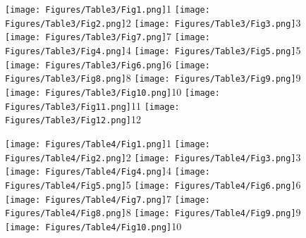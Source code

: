 \documentclass[a4paper, 11pt, oneside]{article}
\begin{document}
\clearpage
{}
\cfoot{\thepage}
\begin{figure}[p]
\texttt{[image: Figures/Table3/Fig1.png]}\tiny 1
\texttt{[image: Figures/Table3/Fig2.png]}\tiny 2
\texttt{[image: Figures/Table3/Fig3.png]}\tiny 3
\texttt{[image: Figures/Table3/Fig7.png]}\tiny 7
\texttt{[image: Figures/Table3/Fig4.png]}\tiny 4
\texttt{[image: Figures/Table3/Fig5.png]}\tiny 5
\texttt{[image: Figures/Table3/Fig6.png]}\tiny 6
\texttt{[image: Figures/Table3/Fig8.png]}\tiny 8
\texttt{[image: Figures/Table3/Fig9.png]}\tiny 9
\texttt{[image: Figures/Table3/Fig10.png]}\tiny 10
\texttt{[image: Figures/Table3/Fig11.png]}\tiny 11
\texttt{[image: Figures/Table3/Fig12.png]}\tiny 12
\end{figure}
\clearpage
{}
\cfoot{\thepage}
\begin{figure}[p]
\texttt{[image: Figures/Table4/Fig1.png]}\tiny 1
\texttt{[image: Figures/Table4/Fig2.png]}\tiny 2
\texttt{[image: Figures/Table4/Fig3.png]}\tiny 3
\texttt{[image: Figures/Table4/Fig4.png]}\tiny 4
\texttt{[image: Figures/Table4/Fig5.png]}\tiny 5
\texttt{[image: Figures/Table4/Fig6.png]}\tiny 6
\texttt{[image: Figures/Table4/Fig7.png]}\tiny 7
\texttt{[image: Figures/Table4/Fig8.png]}\tiny 8
\texttt{[image: Figures/Table4/Fig9.png]}\tiny 9
\texttt{[image: Figures/Table4/Fig10.png]}\tiny 10
\end{figure}
\clearpage
\end{document}

